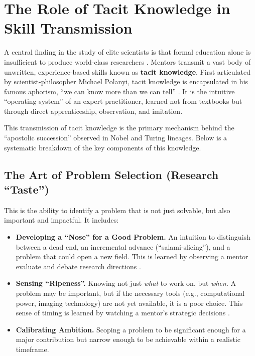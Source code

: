 
\section{The Role of Tacit Knowledge in Skill Transmission}
\label{sec:tacit_knowledge}

A central finding in the study of elite scientists is that formal education alone is insufficient to produce world-class researchers \citep{zuckerman1977}.
Mentors transmit a vast body of unwritten, experience-based skills known as \textbf{tacit knowledge}.
First articulated by scientist-philosopher Michael Polanyi, tacit knowledge is encapsulated in his famous aphorism, ``we can know more than we can tell'' \citep{polanyi1966}.
It is the intuitive ``operating system'' of an expert practitioner, learned not from textbooks but through direct apprenticeship, observation, and imitation.

This transmission of tacit knowledge is the primary mechanism behind the ``apostolic succession'' observed in Nobel and Turing lineages.
Below is a systematic breakdown of the key components of this knowledge.

\subsection{The Art of Problem Selection (Research ``Taste'')}
This is the ability to identify a problem that is not just solvable, but also important and impactful.
It includes:
\begin{itemize}[leftmargin=*]
    \item \textbf{Developing a ``Nose'' for a Good Problem.} An intuition to distinguish between a dead end, an incremental advance (``salami-slicing''), and a problem that could open a new field.
    This is learned by observing a mentor evaluate and debate research directions \citep{zuckerman1977}.
    \item \textbf{Sensing ``Ripeness''.} Knowing not just \textit{what} to work on, but \textit{when}.
    A problem may be important, but if the necessary tools (e.g., computational power, imaging technology) are not yet available, it is a poor choice.
    This sense of timing is learned by watching a mentor's strategic decisions \citep{medawar1979}.
    \item \textbf{Calibrating Ambition.} Scoping a problem to be significant enough for a major contribution but narrow enough to be achievable within a realistic timeframe.
\end{itemize}

